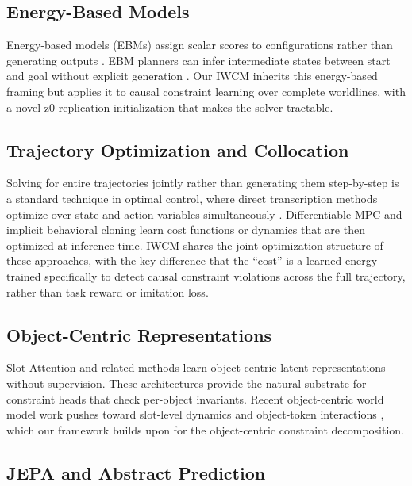 \documentclass[12pt]{article}
\begin{document}
\subsection{Energy-Based Models}

Energy-based models (EBMs) assign scalar scores to configurations rather than generating outputs \citep{lecun2006tutorial}. EBM planners can infer intermediate states between start and goal without explicit generation \citep{du2019implicit}. Our IWCM inherits this energy-based framing but applies it to causal constraint learning over complete worldlines, with a novel z0-replication initialization that makes the solver tractable.

\subsection{Trajectory Optimization and Collocation}

Solving for entire trajectories jointly rather than generating them step-by-step is a standard technique in optimal control, where direct transcription methods optimize over state and action variables simultaneously \citep{betts2010}. Differentiable MPC \citep{amos2018} and implicit behavioral cloning \citep{florence2022} learn cost functions or dynamics that are then optimized at inference time. IWCM shares the joint-optimization structure of these approaches, with the key difference that the ``cost'' is a learned energy trained specifically to detect causal constraint violations across the full trajectory, rather than task reward or imitation loss.

\subsection{Object-Centric Representations}

Slot Attention \citep{locatello2020object} and related methods learn object-centric latent representations without supervision. These architectures provide the natural substrate for constraint heads that check per-object invariants. Recent object-centric world model work pushes toward slot-level dynamics and object-token interactions \citep{kipf2022conditional}, which our framework builds upon for the object-centric constraint decomposition.

\subsection{JEPA and Abstract Prediction}
\end{document}
